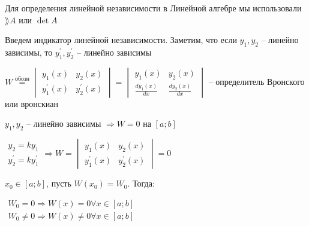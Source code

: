\documentclass[12pt]{article}
\begin{document}
    \Mem Для определения линейной независимости в Линейной алгебре мы использовали $\rang A$ или $\det A$

    Введем индикатор линейной независимости.
    Заметим, что если $y_1, y_2$ -- линейно зависимы, то $y_1^\prime, y_2^\prime$ -- линейно зависимы

    \hypertarget{determinantWronski}{}

    \Def $W \stackrel{\text{обозн}}{=} \begin{vmatrix}y_1(x) & y_2(x) \\ y_1^\prime(x) & y_2^\prime(x)\end{vmatrix} = \begin{vmatrix}y_1(x) & y_2(x) \\ \frac{d y_1(x)}{dx} & \frac{d y_2(x)}{dx}\end{vmatrix}$ -- определитель Вронского или вронскиан

    \begin{MyTheorem}
         $y_1, y_2$ -- линейно зависимы $\Longrightarrow W = 0$ на $[a;b]$
    \end{MyTheorem}

    \begin{MyProof}
        $\begin{matrix}y_2 = k y_1 \\ y_2^\prime = k y_1^\prime\end{matrix} \Longrightarrow W = \begin{vmatrix}y_1(x) & y_2(x) \\ y_1^\prime(x) & y_2^\prime(x)\end{vmatrix} = 0$
    \end{MyProof}

    \begin{MyTheorem}
         $x_0 \in [a;b]$, пусть $W(x_0) = W_0$. Тогда: 
        
        $\begin{matrix}W_0 = 0 \Longrightarrow W(x) = 0 \forall x \in [a;b] \\
        W_0 \neq 0 \Longrightarrow W(x) \neq 0 \forall x \in [a;b]\end{matrix}$
    \end{MyTheorem}
\end{document}
